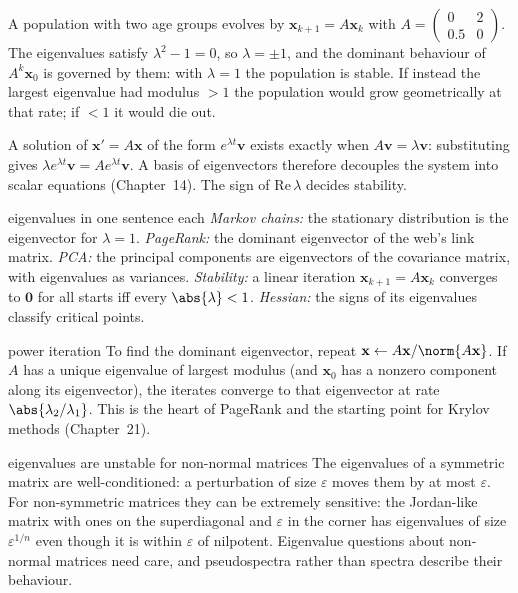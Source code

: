 \begin{example}
A population with two age groups evolves by $\mathbf{x}_{k+1}=A\mathbf{x}_k$ with $A=\begin{pmatrix}0&2\\0.5&0\end{pmatrix}$. The eigenvalues satisfy $\lambda^2-1=0$, so $\lambda=\pm1$, and the dominant behaviour of $A^k\mathbf{x}_0$ is governed by them: with $\lambda=1$ the population is stable. If instead the largest eigenvalue had modulus $>1$ the population would grow geometrically at that rate; if $<1$ it would die out.
\end{example}

\begin{example}
A solution of $\mathbf{x}'=A\mathbf{x}$ of the form $e^{\lambda t}\mathbf{v}$ exists exactly when $A\mathbf{v}=\lambda\mathbf{v}$: substituting gives $\lambda e^{\lambda t}\mathbf{v}=Ae^{\lambda t}\mathbf{v}$. A basis of eigenvectors therefore decouples the system into scalar equations (Chapter~14). The sign of $\mathrm{Re}\,\lambda$ decides stability.
\end{example}

\begin{interview}{eigenvalues in one sentence each}
\emph{Markov chains:} the stationary distribution is the eigenvector for $\lambda=1$. \emph{PageRank:} the dominant eigenvector of the web's link matrix. \emph{PCA:} the principal components are eigenvectors of the covariance matrix, with eigenvalues as variances. \emph{Stability:} a linear iteration $\mathbf{x}_{k+1}=A\mathbf{x}_k$ converges to $\mathbf{0}$ for all starts iff every $\abs{\lambda}<1$. \emph{Hessian:} the signs of its eigenvalues classify critical points.
\end{interview}

\begin{interview}{power iteration}
To find the dominant eigenvector, repeat $\mathbf{x}\leftarrow A\mathbf{x}/\norm{A\mathbf{x}}$. If $A$ has a unique eigenvalue of largest modulus (and $\mathbf{x}_0$ has a nonzero component along its eigenvector), the iterates converge to that eigenvector at rate $\abs{\lambda_2/\lambda_1}$. This is the heart of PageRank and the starting point for Krylov methods (Chapter~21).
\end{interview}

\begin{nuance}{eigenvalues are unstable for non-normal matrices}
The eigenvalues of a symmetric matrix are well-conditioned: a perturbation of size $\varepsilon$ moves them by at most $\varepsilon$. For non-symmetric matrices they can be extremely sensitive: the Jordan-like matrix with ones on the superdiagonal and $\varepsilon$ in the corner has eigenvalues of size $\varepsilon^{1/n}$ even though it is within $\varepsilon$ of nilpotent. Eigenvalue questions about non-normal matrices need care, and pseudospectra rather than spectra describe their behaviour.
\end{nuance}

